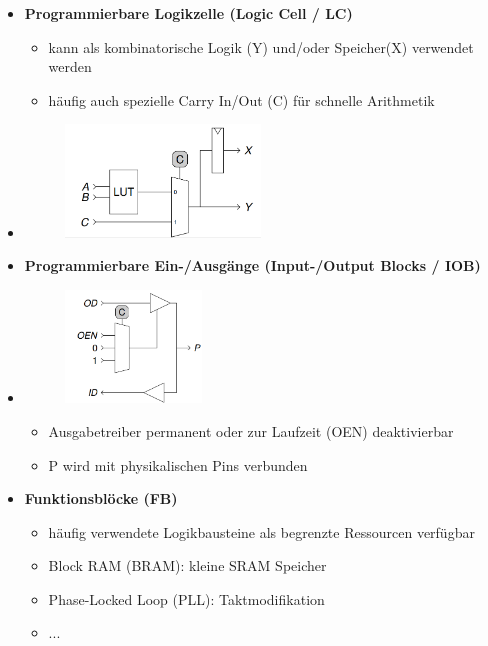 \documentclass[11pt,a4paper]{article}
\begin{document}
\begin{itemize}
\item \textbf{Programmierbare Logikzelle (Logic Cell / LC)}
	\begin{itemize}
	\item kann als kombinatorische Logik (Y) und/oder Speicher(X) verwendet werden
	\item häufig auch spezielle Carry In/Out (C) für schnelle Arithmetik
	\end{itemize}
\item[]
			\begin{figure}[H]
			\begin{center}
			\includegraphics[height=3cm]{logiccell}
			\end{center}
			\end{figure}

\item \textbf{Programmierbare Ein-/Ausgänge (Input-/Output Blocks / IOB)}
\item[]
		\begin{minipage}{0.3\textwidth}
				\begin{figure}[H]
				\includegraphics[height=3cm]{iob}
				\end{figure}
			\end{minipage}
			\begin{minipage}[t]{0.6\textwidth}
				\vspace{-1.5cm}
				\begin{itemize}
				\item Ausgabetreiber permanent oder zur Laufzeit (OEN) deaktivierbar
				\item P wird mit physikalischen Pins verbunden
				\end{itemize}
			\end{minipage}

\item \textbf{Funktionsblöcke (FB)}
	\begin{itemize}
	\item häufig verwendete Logikbausteine als begrenzte Ressourcen verfügbar
	\item Block RAM (BRAM): kleine SRAM Speicher
	\item Phase-Locked Loop (PLL): Taktmodifikation
	\item ...
	\end{itemize}

\end{itemize}
\end{document}
